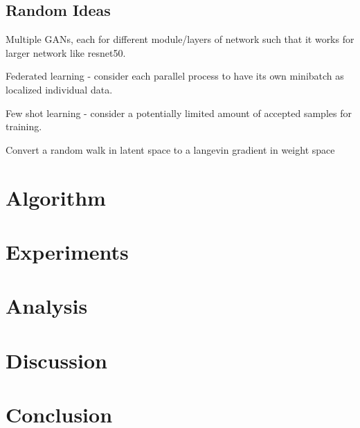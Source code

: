 \documentclass[honours,12pt]{unswthesis}
\numberwithin{equation}{section}
\begin{document}
\section{Random Ideas}
Multiple GANs, each for different module/layers of network such that it works for larger network like resnet50.

Federated learning - consider each parallel process to have its own minibatch as localized individual data.

Few shot learning - consider a potentially limited amount of accepted samples for training. 

Convert a random walk in latent space to a langevin gradient in weight space




\chapter{Algorithm}\label{meth}




\chapter{Experiments}\label{expe}


\chapter{Analysis}\label{anal}


\chapter{Discussion}\label{disc}

\chapter{Conclusion}\label{conc}




\clearpage


\end{document}
